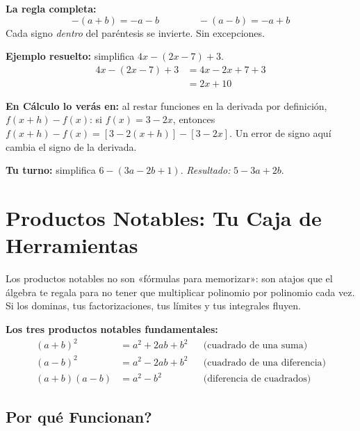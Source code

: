 \documentclass[12pt, letterpaper]{article}
\begin{document}
\begin{cuadrosolucion}
  \textbf{La regla completa:}
  \[
    -(a + b) = -a - b \qquad\qquad -(a - b) = -a + b
  \]
  Cada signo \emph{dentro} del paréntesis se invierte. Sin excepciones.
\end{cuadrosolucion}

\begin{cuadropasos}
  \textbf{Ejemplo resuelto:} simplifica $4x - (2x - 7) + 3$.
  \begin{align*}
    4x - (2x - 7) + 3 &= 4x - 2x + 7 + 3 \\
                       &= 2x + 10
  \end{align*}
\end{cuadropasos}

\noindent\textbf{En Cálculo lo verás en:} al restar funciones en la derivada por definición, $f(x+h) - f(x)$: si $f(x) = 3 - 2x$, entonces $f(x+h) - f(x) = [3 - 2(x+h)] - [3 - 2x]$. Un error de signo aquí cambia el signo de la derivada.

\noindent\textbf{Tu turno:} simplifica $6 - (3a - 2b + 1)$. \emph{Resultado:} $5 - 3a + 2b$.


\section{Productos Notables: Tu Caja de Herramientas}

Los productos notables no son «fórmulas para memorizar»: son atajos que el álgebra te regala para no tener que multiplicar polinomio por polinomio cada vez. Si los dominas, tus factorizaciones, tus límites y tus integrales fluyen.

\begin{cuadroteoria}
  \textbf{Los tres productos notables fundamentales:}
  \begin{align*}
    (a+b)^2    &= a^2 + 2ab + b^2            &&\text{(cuadrado de una suma)} \\
    (a-b)^2    &= a^2 - 2ab + b^2            &&\text{(cuadrado de una diferencia)} \\
    (a+b)(a-b) &= a^2 - b^2                  &&\text{(diferencia de cuadrados)}
  \end{align*}
\end{cuadroteoria}

\subsection{\textquestiondown Por qué Funcionan?}
\end{document}
